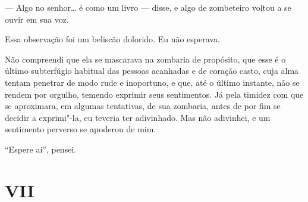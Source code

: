 --- Algo no senhor\ldots{} é como um livro --- disse, e algo de zombeteiro
voltou a se ouvir em sua voz.

Essa observação foi um beliscão dolorido. Eu não esperava.

Não compreendi que ela se mascarava na zombaria de propósito, que esse é
o último subterfúgio habitual das pessoas acanhadas e de coração casto,
cuja alma tentam penetrar de modo rude e inoportuno, e que, até o último
instante, não se rendem por orgulho, temendo exprimir seus sentimentos.
Já pela timidez com que se aproximara, em algumas tentativas, de sua
zombaria, antes de por fim se decidir a exprimi"-la, eu teveria ter
adivinhado. Mas não adivinhei, e um sentimento perverso se apoderou de
mim.

``Espere aí'', pensei.

\section{VII}

